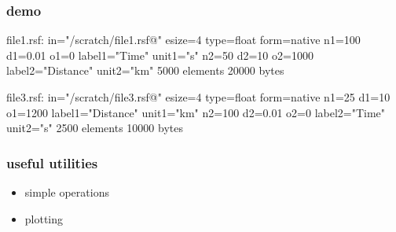 \begin{frame}[fragile] \frametitle{demo}
  
  
  \vfill
  
  \tiny
\begin{semiverbatim}
file1.rsf:
    in="/scratch/file1.rsf@"
    esize=4 type=float form=native
    n1=100         d1=0.01        o1=0          label1="Time" unit1="s"
    n2=50          d2=10          o2=1000       label2="Distance" unit2="km"
        5000 elements 20000 bytes
\end{semiverbatim}
\normalsize

  \vfill

  \tiny
\begin{semiverbatim}
file3.rsf:
    in="/scratch/file3.rsf@"
    esize=4 type=float form=native
    n1=25          d1=10          o1=1200       label1="Distance" unit1="km"
    n2=100         d2=0.01        o2=0          label2="Time" unit2="s"
        2500 elements 10000 bytes
\end{semiverbatim}
\end{frame}
\cwpnote{}

\begin{frame} \frametitle{useful utilities}

  \begin{itemize}
  \item simple operations
  \item plotting
  \end{itemize}
  
\end{frame}
\cwpnote{}


